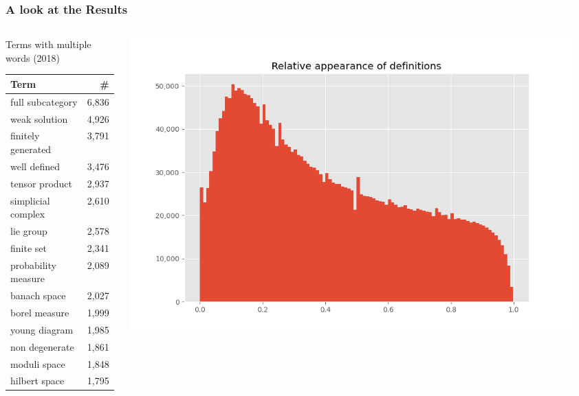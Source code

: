 \documentclass[10pt]{beamer}
\begin{document}
\begin{frame}
    \frametitle{A look at the Results}
    \begin{columns}
        \begin{column}{0.4\textwidth}
            Terms with multiple words (2018)\\
            \begin{tabular}{lr}
                \toprule
                \textbf{Term} & \textbf{\#}  \\
                \midrule
full subcategory &  6,836 \\
weak solution &  4,926 \\
finitely generated &  3,791 \\
well defined &  3,476 \\
tensor product &  2,937 \\
simplicial complex &  2,610 \\
lie group &  2,578 \\
finite set &  2,341 \\
probability measure &  2,089 \\
banach space &  2,027 \\
borel measure &  1,999 \\
young diagram &  1,985 \\
non degenerate &  1,861 \\
moduli space &  1,848 \\
hilbert space &  1,795 \\
\bottomrule
            \end{tabular}
        \end{column}
        \begin{column}{0.6\textwidth}
            \begin{center}
                \includegraphics[width=0.95\textwidth]{../Images/rel_appe.png}


\end{center}
\end{column}
\end{columns}
\end{frame}
\end{document}
